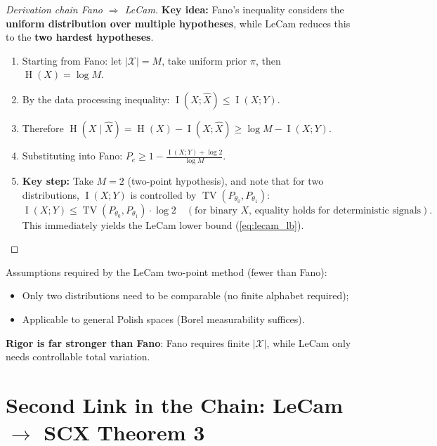 \documentclass[12pt,a4paper]{article}
\theoremstyle{plain}
\theoremstyle{definition}
\newcommand{\strictness}[1]{{\small\sffamily[#1]}}
\DeclareMathOperator{\TV}{TV}
\DeclareMathOperator{\Ent}{H}
\DeclareMathOperator{\MI}{I}
\begin{document}
\begin{proof}[Derivation chain Fano $\Rightarrow$ LeCam]
\textbf{Key idea:} Fano's inequality considers the \textbf{uniform distribution over multiple hypotheses}, while LeCam reduces this to the \textbf{two hardest hypotheses}.
\begin{enumerate}
    \item Starting from Fano: let $|\mathcal{X}| = M$, take uniform prior $\pi$, then $\Ent(X) = \log M$.
    \item By the data processing inequality: $\MI(X; \hat{X}) \leq \MI(X; Y)$.
    \item Therefore $\Ent(X \mid \hat{X}) = \Ent(X) - \MI(X; \hat{X}) \geq \log M - \MI(X; Y)$.
    \item Substituting into Fano: $P_e \geq 1 - \frac{\MI(X; Y) + \log 2}{\log M}$.
    \item \textbf{Key step:} Take $M=2$ (two-point hypothesis), and note that for two distributions,
    $\MI(X;Y)$ is controlled by $\TV(P_{\theta_0}, P_{\theta_1})$:
    \begin{equation}
    \MI(X;Y) \leq \TV(P_{\theta_0}, P_{\theta_1}) \cdot \log 2
    \quad (\text{for binary $X$, equality holds for deterministic signals}).
    \end{equation}
    This immediately yields the LeCam lower bound (\ref{eq:lecam_lb}).
\end{enumerate}
\strictness{Rigorous: at $M=2$ degeneracy, Fano $\equiv$ LeCam, no information loss}
\end{proof}

\begin{assumecheck}
Assumptions required by the LeCam two-point method (fewer than Fano):
\begin{itemize}
    \item Only two distributions need to be comparable (no finite alphabet required);
    \item Applicable to general Polish spaces (Borel measurability suffices).
\end{itemize}
\textbf{Rigor is far stronger than Fano}: Fano requires finite $|\mathcal{X}|$, while LeCam only needs controllable total variation.
\end{assumecheck}

\section{Second Link in the Chain: LeCam $\to$ SCX Theorem 3}
\label{sec:scx_thm3}
\end{document}

